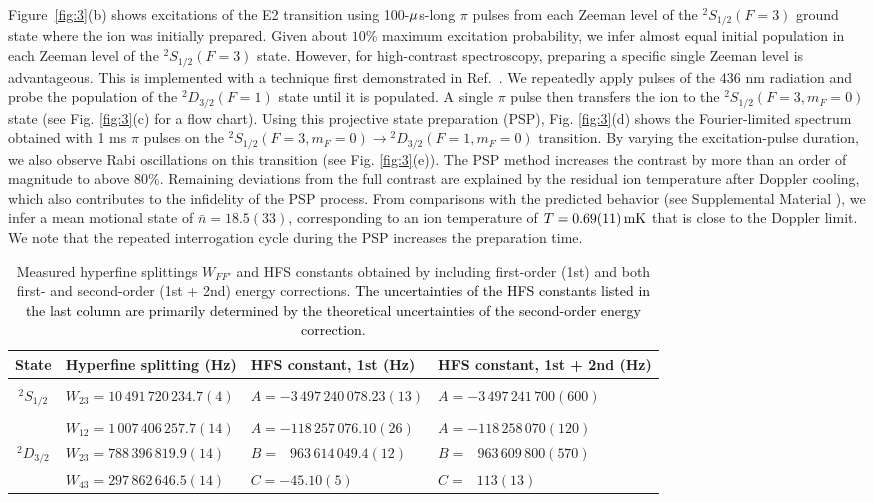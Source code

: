 \documentclass[
reprint,
superscriptaddress,









amsmath,amssymb,
aps,prl






]{revtex4-2}
\newcommand{\m}[1]{\textcolor{black}{#1}}
\begin{document}
Figure~\ref{fig:3}(b) shows excitations of the E2 transition using 100-$\rm{}\mu$s-long $\pi$ pulses from each Zeeman level of the $^2\!S_{1/2}(F=3)$ ground state where the ion was initially prepared. Given about $10\%$ maximum excitation probability, we infer almost equal initial population in each Zeeman level of the $^2\!S_{1/2}(F=3)$ state.
However, for high-contrast spectroscopy, preparing a specific single Zeeman level is advantageous. This is implemented with a technique first demonstrated in Ref.~\cite{Chou2017}. We repeatedly apply pulses of the 436 nm radiation
and probe the population of the $^2\!D_{3/2}(F=1)$ state until it is populated. A single $\pi$ pulse then transfers the ion to the $^2\!S_{1/2}(F=3,m_F=0)$ state (see Fig. \ref{fig:3}(c) for a flow chart).
Using this projective state preparation (PSP), Fig. \ref{fig:3}(d) shows the Fourier-limited spectrum obtained with 1 ms $\pi$ pulses on the $^2\!S_{1/2}(F=3,m_F=0) \rightarrow {}^2\!D_{3/2}(F=1,m_F=0)$ transition. By varying the excitation-pulse duration, we also observe Rabi oscillations on this transition (see Fig. \ref{fig:3}(e)). The PSP method increases the contrast by more than an order of magnitude to above 80\%.  Remaining deviations from the full contrast are explained by the residual ion temperature after Doppler cooling, which also contributes to the infidelity of the PSP process. From comparisons with the predicted behavior (see Supplemental Material \cite{appendixA}), we infer a mean motional state of $\bar{n}=18.5(33)$, corresponding to an ion temperature of $T=0.69(11)\, \rm{mK}$ that is close to the Doppler limit. We note that the repeated interrogation cycle during the PSP increases the preparation time.

\begin{table}[t]
\caption{\label{tab:1}
Measured hyperfine splittings $W_{FF'}$ and HFS constants obtained by including first-order (1st) and both first- and second-order (1st + 2nd) energy corrections. \m{The uncertainties of the HFS constants listed in the last column are primarily determined by the theoretical uncertainties of the second-order energy correction.}
}
\begin{ruledtabular}
\begin{tabular}{clll}
State & Hyperfine splitting (Hz) & HFS constant, 1st (Hz)
& HFS constant, 1st + 2nd (Hz)  \\ [0.5ex]
\hline \\ [-1.5ex]
${}^2\!S_{1/2}$ & $W_{23}=10\,491\,720\,234.7(4)$ & $A = -3\,497\,240\,078.23(13)$ & $A = -3\,497\,241\,700(600)$ \\ [0.8ex]
\hline \\[-1.5ex]
\multicolumn{1}{c}{}& $W_{12}=1\,007\,406\,257.7(14)$ & $A = -118\,257\,076.10(26)$ & $A = -118\,258\,070(120)$ \\ [0.5ex]
${}^2\!D_{3/2}$ & $W_{23}=788\,396\,819.9(14)$ & $B = \;\;\,963\,614\,049.4(12)$ &$B = \;\;\,963\,609\,800(570)$\\ [0.5ex]
\multicolumn{1}{c}{}& $W_{43}=297\,862\,646.5(14)$ & $C = -45.10(5)$ & $C = \;\;\,113(13)$
\end{tabular}
\end{ruledtabular}
\end{table}
\end{document}
